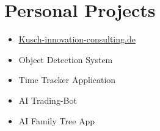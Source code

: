 \section{Personal Projects}

\begin{paracol}{2}
\begin{itemize}
    \item \href{https://kusch-innovation-consulting.de/}{Kusch-innovation-consulting.de}
    \item Object Detection System
    \item Time Tracker Application
\end{itemize}
\switchcolumn
\begin{itemize}
    \item AI Trading-Bot
    \item AI Family Tree App
\end{itemize}
\end{paracol}
